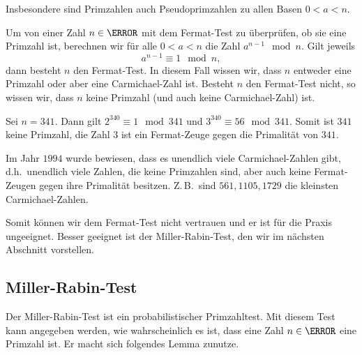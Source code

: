 \begin{remark}
Insbesondere sind Primzahlen auch Pseudoprimzahlen zu allen Basen $0 < a < n$. 
\end{remark}

\begin{construction}
 Um von einer Zahl $n \in \N$ mit dem Fermat-Test zu überprüfen, ob sie eine Primzahl ist, berechnen wir für alle $0<a<n$ die Zahl $a^{n-1} \mod n$. Gilt jeweils
 \[a^{n-1} \equiv 1 \mod n,\]
 dann besteht $n$ den Fermat-Test. In diesem Fall wissen wir, dass $n$ entweder eine Primzahl oder aber eine Carmichael-Zahl ist. Besteht $n$ den Fermat-Test nicht, so wissen wir, dass $n$ keine Primzahl (und auch keine Carmichael-Zahl) ist.
\end{construction}


\begin{example}
 Sei $n = 341$. Dann gilt $2^{340} \equiv 1 \mod 341$ und $3^{340} \equiv 56 \mod 341$. Somit ist $341$ keine Primzahl, die Zahl $3$ ist ein Fermat-Zeuge gegen die Primalität von $341$.
\end{example}


\begin{remark}
  Im Jahr $1994$ wurde bewiesen, dass es unendlich viele Carmichael-Zahlen gibt, d.\;h.~unendlich viele Zahlen, die keine Primzahlen sind, aber auch keine Fermat-Zeugen gegen ihre Primalität besitzen. Z.\,B.~sind $561, 1105, 1729$ die kleinsten Carmichael-Zahlen. 
  
  Somit können wir dem Fermat-Test nicht vertrauen und er ist für die Praxis ungeeignet. Besser geeignet ist der Miller-Rabin-Test, den wir im nächsten Abschnitt vorstellen.
\end{remark}



\subsection{Miller-Rabin-Test}

Der Miller-Rabin-Test ist ein probabilistischer Primzahltest. Mit diesem Test kann angegeben werden, wie wahrscheinlich es ist, dass eine Zahl $n \in \N$ eine Primzahl ist. Er macht sich folgendes Lemma zunutze.

